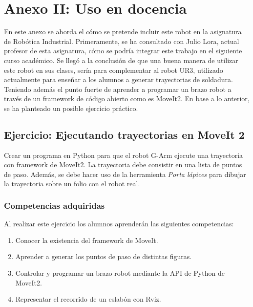 \chapter*{Anexo II: Uso en docencia}
\label{cap:anexoii}

\noindent En este anexo se aborda el cómo se pretende incluir este robot en la asignatura de Robótica Industrial. Primeramente, 
se ha consultado con Julio Lora, actual profesor de esta asignatura, cómo se podría integrar este trabajo en el siguiente curso académico. Se llegó 
a la conclusión de que una buena manera de utilizar este robot en sus clases, sería para complementar al robot UR3, utilizado actualmente 
para enseñar a los alumnos a generar trayectorias de soldadura. Teniendo además el punto fuerte de aprender a programar un brazo robot a través de un framework 
de código abierto como es MoveIt2. En base a lo anterior, se ha planteado un posible ejercicio práctico.

\section*{Ejercicio: Ejecutando trayectorias en MoveIt 2}
\noindent Crear un programa en Python para que el robot G-Arm ejecute una trayectoria con framework de MoveIt2. La trayectoria debe consistir 
en una lista de puntos de paso. Además, se debe hacer uso de la herramienta \textit{Porta lápices} para dibujar la trayectoria sobre un folio 
con el robot real. 

\subsection*{Competencias adquiridas}
\noindent Al realizar este ejercicio los alumnos aprenderán las siguientes competencias:
\begin{enumerate}
    \item Conocer la existencia del framework de MoveIt.
    \item Aprender a generar los puntos de paso de distintas figuras.
    \item Controlar y programar un brazo robot mediante la API de Python de MoveIt2.
    \item Representar el recorrido de un eslabón con Rviz.    
\end{enumerate}

\newpage
